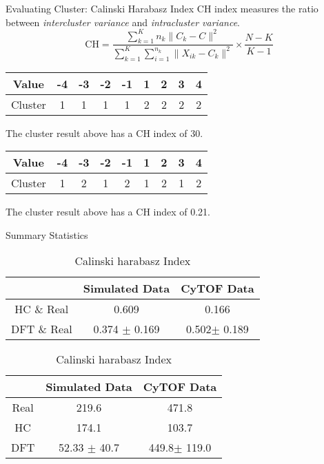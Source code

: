 \documentclass{beamer}
\begin{document}
	\begin{frame}{Evaluating Cluster: Calinski Harabasz Index}
	CH index measures the ratio between \emph{intercluster variance} and \emph{intracluster variance}.
			$$ \text{CH} = \frac{ \sum_{k=1}^{K}n_{k} \lVert C_{k} - C \rVert^2 }{\sum_{k=1}^{K}\sum_{i=1}^{n_k} \lVert X_{ik} - C_{k} \rVert^2  } \times \frac{N-K}{K-1} $$
		\begin{table}[htbp]
			\centering
			\begin{tabular}{c|c|c|c|c|c|c|c|c}
				Value & -4 & -3 & -2 & -1 & 1 & 2 & 3 & 4 \\
				\hline
				Cluster & 1 & 1 & 1 & 1 & 2 & 2 & 2 & 2 
			\end{tabular}
		\end{table}
		 The cluster result above has a CH index of 30.
		
		\begin{table}[htbp]
			\centering
			\begin{tabular}{c|c|c|c|c|c|c|c|c}
				Value & -4 & -3 & -2 & -1 & 1 & 2 & 3 & 4 \\
				\hline
				Cluster & 1 & 2 & 1 & 2 & 1 & 2 & 1 & 2 
			\end{tabular}
		\end{table}
		
		The cluster result above has a CH index of 0.21.
	\end{frame}
	
	\begin{frame}{Summary Statistics}
				 \begin{table}[htbp]
				 		\centering
    		\begin{tabular}{ccc}
       				\toprule
       					& Simulated Data & CyTOF Data\\
      				 \midrule
       					HC \& Real & 0.609 & 0.166\\
       				DFT \& Real & 0.374 $\pm$ 0.169 & 0.502$\pm$ 0.189\\
       				\bottomrule
    				\end{tabular}
    				\caption*{Adjusted Rand Index}

    		\begin{tabular}{ccc}
       \toprule
       & Simulated Data & CyTOF Data\\
       \midrule
       Real & 219.6 & 471.8\\
       HC & 174.1 & 103.7\\
       DFT & 52.33 $\pm$ 40.7 & 449.8$\pm$ 119.0\\
       \bottomrule
    \end{tabular}
    				\caption*{Calinski harabasz Index}
				 \end{table}
	
	\end{frame}
	
\end{document}
